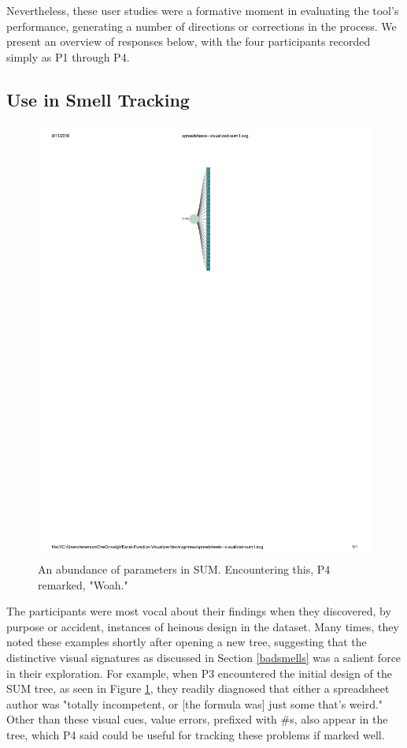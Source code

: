 \documentclass[conference]{IEEEtran}
\begin{document}
	Nevertheless, these user studies were a formative moment in evaluating the
	tool's performance, generating a number of directions or corrections in the
	process. We present an overview of responses below, with the four participants
	recorded simply as P1 through P4. \par
	
	\subsection{Use in Smell Tracking} \begin{figure}
		\centering \includegraphics{SUM}  \caption{An abundance of
			parameters in SUM. Encountering this, P4 remarked, "Woah."} \label{fig:sum} \end{figure}
	
	The participants were most vocal about their findings when they discovered, by
	purpose or accident, instances of heinous design in the dataset. Many times,
	they noted these examples shortly after opening a new tree, suggesting that the
	distinctive visual signatures as discussed in Section \ref{badsmells} was a
	salient force in their exploration. For example, when P3 encountered the
	initial design of the SUM tree, as seen in Figure \ref{fig:sum}, they readily
	diagnosed that either a spreadsheet author was "totally incompetent, or [the
	formula was] just some that's weird." Other than these visual cues, value
	errors, prefixed with \#s, also appear in the tree, which P4 said could be
	useful for tracking these problems if marked well.
	
\end{document}
